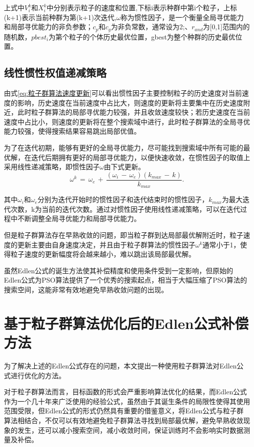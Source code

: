 上式中\(V^{k}_i\)和\( X^{k}_i\)中分别表示粒子的速度和位置,下标i表示种群中第i个粒子，上标(k+1)表示当前种群为第(k+1)次迭代,\(\omega\)称为惯性因子，是一个衡量全局寻优能力和局部寻优能力的非负参数；\(c_p\)和\(c_g\)为非负常数，通常设为2;、\(r_{and}\)为[0,1]范围内的随机数，\(pbest_i\)为第个粒子的个体历史最优位置，gbest为整个种群的历史最优位置。

\subsection{线性惯性权值递减策略}
由式\eqref{eq:粒子群算法速度更新}可以看出惯性因子主要控制粒子的历史速度对当前速度的影响，历史速度在当前速度中占比大，则速度的更新将主要集中在历史速度附近，此时粒子群算法的局部寻优能力较强，并且收敛速度较快；若历史速度在当前速度中占比小，则速度的更新将在整个搜索域中进行，此时粒子群算法的全局寻优能力较强，使得搜索结果容易跳出局部优值。

为了在迭代初期，能够有更好的全局寻优能力，尽可能找到搜索域中所有可能的最优解，在迭代后期拥有更好的局部寻优能力，以便快速收敛，在惯性因子的取值上采用线性递减策略\cite{冯浩2015一种改进的粒子群优化算法惯性权值递减策略}，即惯性因子\(\omega\)由下式更新。
\begin{equation}\label{eq:omega更新公式}
  \omega^k\,=\,\omega_e\,+\,\frac{(\omega_i\,-\,\omega_e)(k_{max}\,-\,k)}{k_{max}}.
  \end{equation}

其中\(\omega_i\)和\(\omega_e\)分别为迭代开始时的惯性因子和迭代结束时的惯性因子，\(k_{max}\)为最大迭代次数，k为当前的迭代次数。通过对惯性因子使用线性递减策略，可以在迭代过程中不断调整全局寻优能力和局部寻优能力。

但是粒子群算法存在早熟收敛的问题，即当粒子群到达局部最优解附近时，粒子速度的更新主要由自身速度决定，并且由于粒子群算法的惯性因子\(\omega^k\)通常小于1，使得粒子速度的更新幅度将会越来越小，难以跳出该局部最优解\cite{范培蕾2009克服早熟收敛现象的粒子群优化算法}。

虽然Edlen公式的诞生方法使其补偿精度和使用条件受到一定影响，但原始的Edlen公式为PSO算法提供了一个优秀的搜索起点，相当于大幅压缩了PSO算法的搜索空间，这能非常有效地避免早熟收敛问题的出现。

\section{基于粒子群算法优化后的Edlen公式补偿方法}
为了解决上述的Edlen公式存在的问题，本文提出一种使用粒子群算法对Edlen公式进行优化的方法。

对于粒子群算法而言，目标函数的形式会严重影响算法优化的结果，而Edlen公式作为一个几十年来广泛使用的经验公式，虽然由于其诞生条件的局限性使得其使用范围受限，但Edlen公式的形式仍然具有重要的借鉴意义，将Edlen公式与粒子群算法相结合，不仅可以有效地避免粒子群算法寻找到局部最优解，避免早熟收敛现象的发生，还可以减小搜索空间，减小收敛时间，保证训练时不会影响实时数据测量及补偿。
